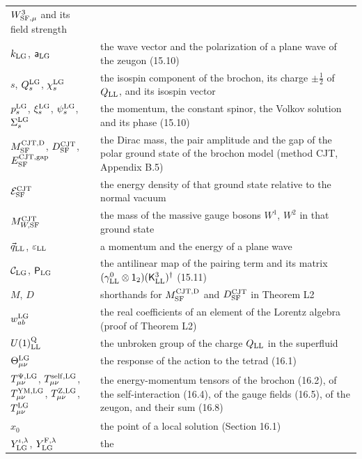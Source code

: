 \documentclass[
  10pt,
]{article}
\begin{document}
\begin{longtable}[]{@{}
  >{\raggedright\arraybackslash}p{}
  >{\raggedright\arraybackslash}p{}@{}}
\(W^3_{{\rm SF},\mu}\) and its field strength \\
\(k_{\rm LG}\), \(\mathsf a_{\rm LG}\) & the wave vector and the
polarization of a plane wave of the zeugon (15.10) \\
\(s\), \(Q^{\rm LG}_s\), \(\chi^{\rm LG}_s\) & the isospin component of
the brochon, its charge \(\pm\tfrac12\) of \(Q_{\rm LL}\), and its
isospin vector \\
\(p^{\rm LG}_s\), \(\xi^{\rm LG}_s\), \(\psi^{\rm LG}_s\),
\(\Sigma^{\rm LG}_s\) & the momentum, the constant spinor, the Volkov
solution and its phase (15.10) \\
\(M^{\rm CJT,D}_{\rm SF}\), \(D^{\rm CJT}_{\rm SF}\),
\(E^{\rm CJT,gap}_{\rm SF}\) & the Dirac mass, the pair amplitude and
the gap of the polar ground state of the brochon model (method CJT,
Appendix B.5) \\
\(\mathcal E^{\rm CJT}_{\rm SF}\) & the energy density of that ground
state relative to the normal vacuum \\
\(M^{\rm CJT}_{W,{\rm SF}}\) & the mass of the massive gauge bosons
\(W^1\), \(W^2\) in that ground state \\
\(\vec q_{\rm LL}\), \(\varepsilon_{\rm LL}\) & a momentum and the
energy of a plane wave \\
\(\mathcal C_{\rm LG}\), \(\mathsf P_{\rm LG}\) & the antilinear map of
the pairing term and its matrix
\((\gamma^0_{\rm LL}\otimes\mathsf 1_2)(\mathsf K^3_{\rm LL})^\dagger\)
(15.11) \\
\(M\), \(D\) & shorthands for \(M^{\rm CJT,D}_{\rm SF}\) and
\(D^{\rm CJT}_{\rm SF}\) in Theorem L2 \\
\(w^{\rm LG}_{ab}\) & the real coefficients of an element of the Lorentz
algebra (proof of Theorem L2) \\
\(U(1)^{\rm Q}_{\rm LL}\) & the unbroken group of the charge
\(Q_{\rm LL}\) in the superfluid \\
\(\Theta^{\rm LG}_{\mu\nu}\) & the response of the action to the tetrad
(16.1) \\
\(T^{\Psi,{\rm LG}}_{\mu\nu}\), \(T^{\rm self,LG}_{\mu\nu}\),
\(T^{\rm YM,LG}_{\mu\nu}\), \(T^{\rm Z,LG}_{\mu\nu}\),
\(T^{\rm LG}_{\mu\nu}\) & the energy-momentum tensors of the brochon
(16.2), of the self-interaction (16.4), of the gauge fields (16.5), of
the zeugon, and their sum (16.8) \\
\(x_0\) & the point of a local solution (Section 16.1) \\
\(Y^{\iota,\lambda}_{\rm LG}\), \(Y^{{\rm F},\lambda}_{\rm LG}\) & the

\end{longtable}
\end{document}
